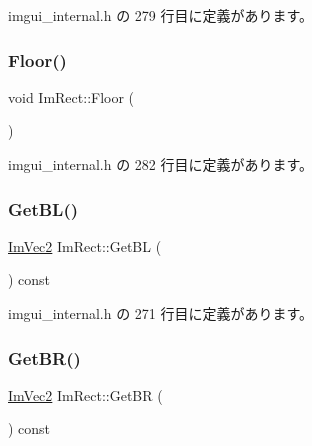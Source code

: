  imgui\+\_\+internal.\+h の 279 行目に定義があります。

\mbox{\label{struct_im_rect_a8fdf75a0c64ff29f65113cd9f8be77ab}} 
\subsubsection{\texorpdfstring{Floor()}{Floor()}}
{\footnotesize\ttfamily void Im\+Rect\+::\+Floor (\begin{DoxyParamCaption}{ }\end{DoxyParamCaption})\hspace{0.3cm}{\ttfamily [inline]}}



 imgui\+\_\+internal.\+h の 282 行目に定義があります。

\mbox{\label{struct_im_rect_a59d9751bc7be6745dddf5b83b9155669}} 
\subsubsection{\texorpdfstring{Get\+B\+L()}{GetBL()}}
{\footnotesize\ttfamily \mbox{\hyperlink{struct_im_vec2}{Im\+Vec2}} Im\+Rect\+::\+Get\+BL (\begin{DoxyParamCaption}{ }\end{DoxyParamCaption}) const\hspace{0.3cm}{\ttfamily [inline]}}



 imgui\+\_\+internal.\+h の 271 行目に定義があります。

\mbox{\label{struct_im_rect_ad2f2687254beed5a9b19bde0d6fa14f5}} 
\subsubsection{\texorpdfstring{Get\+B\+R()}{GetBR()}}
{\footnotesize\ttfamily \mbox{\hyperlink{struct_im_vec2}{Im\+Vec2}} Im\+Rect\+::\+Get\+BR (\begin{DoxyParamCaption}{ }\end{DoxyParamCaption}) const\hspace{0.3cm}{\ttfamily [inline]}}



